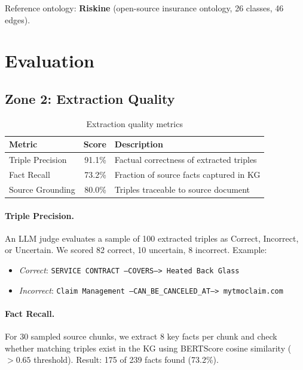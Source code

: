 \documentclass[11pt]{article}
\begin{document}
Reference ontology: \textbf{Riskine} (open-source insurance ontology, 26 classes, 46 edges).

\section{Evaluation}

\subsection{Zone 2: Extraction Quality}

\begin{table}[h]
\centering
\caption{Extraction quality metrics}
\begin{tabular}{lrl}
\toprule
\textbf{Metric} & \textbf{Score} & \textbf{Description} \\
\midrule
Triple Precision & 91.1\% & Factual correctness of extracted triples \\
Fact Recall & 73.2\% & Fraction of source facts captured in KG \\
Source Grounding & 80.0\% & Triples traceable to source document \\
\bottomrule
\end{tabular}
\end{table}

\paragraph{Triple Precision.}
An LLM judge evaluates a sample of 100 extracted triples as Correct, Incorrect, or Uncertain. We scored 82 correct, 10 uncertain, 8 incorrect. Example:
\begin{itemize}[nosep]
    \item \textit{Correct}: \texttt{SERVICE CONTRACT --COVERS--> Heated Back Glass}
    \item \textit{Incorrect}: \texttt{Claim Management --CAN\_BE\_CANCELED\_AT--> mytmoclaim.com}
\end{itemize}

\paragraph{Fact Recall.}
For 30 sampled source chunks, we extract 8 key facts per chunk and check whether matching triples exist in the KG using BERTScore cosine similarity ($>0.65$ threshold). Result: 175 of 239 facts found (73.2\%).
\end{document}
